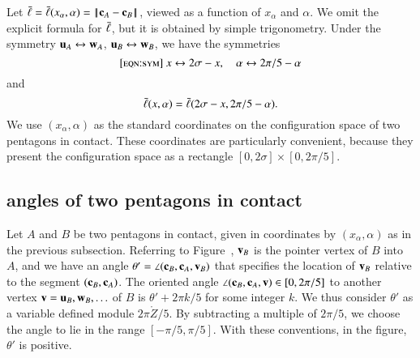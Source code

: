 

Let $\bl = \bl(x_\alpha,\alpha) = \norm{\c_A}{\c_B}$, viewed as a
function of $x_\alpha$ and $\alpha$.  We omit the explicit formula for
$\bar\ell$, but it is obtained by simple trigonometry.  Under the symmetry
${\mathbf u}_A\leftrightarrow {\mathbf w}_A$, ${\mathbf u}_B\leftrightarrow{\mathbf w}_B$, we have the
symmetries 
\begin{equation}\libel{eqn:sym}
x\leftrightarrow 2\sigma-x,
\quad \alpha\leftrightarrow 2\pi/5-\alpha
\end{equation}
and
\[
\bar\ell(x,\alpha) = \bar\ell(2\sigma-x,2\pi/5 - \alpha).
\]
We use $(x_\alpha,\alpha)$ as the standard coordinates on the
configuration space of two pentagons in contact.  These coordinates
are particularly convenient, because they present the configuration
space as a rectangle $[0,2\sigma]\times[0,2\pi/5]$.


\subsection{angles of two pentagons in contact}

Let $A$ and $B$ be two pentagons in contact, given in coordinates by
$(x_\alpha,\alpha)$ as in the previous subsection.  Referring to
Figure~, ${\mathbf v}_B$ is the pointer vertex of $B$ into $A$,
and we have an angle $\theta' = \angle({\mathbf c}_B,{\mathbf c}_A,{\mathbf v}_B)$ that specifies
the location of ${\mathbf v}_B$ relative to the segment $({\mathbf c}_B,{\mathbf c}_A)$.  The
oriented angle $\angle({\mathbf c}_B,{\mathbf c}_A,{\mathbf v})\in[0,2\pi/5]$ to another vertex
${\mathbf v}={\mathbf u}_B,{\mathbf w}_B,\ldots$ of $B$ is $\theta' + 2\pi k/5$ for some integer
$k$.  We thus consider $\theta'$ as a variable defined module
$2\pi\ring{Z}/5$.  By subtracting a multiple of $2\pi/5$, we choose
the angle to lie in the range $[-\pi/5,\pi/5]$.  With these
conventions, in the figure, $\theta'$ is positive.

